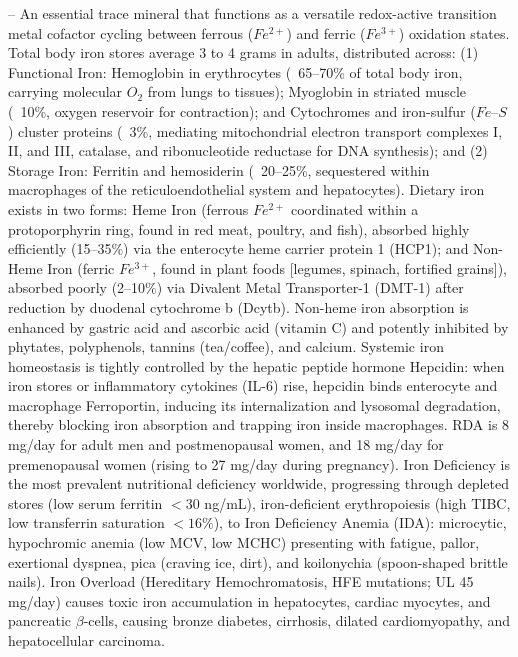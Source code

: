 -- An essential trace mineral that functions as a versatile redox-active transition metal cofactor cycling between ferrous ($Fe^{2+}$) and ferric ($Fe^{3+}$) oxidation states. Total body iron stores average 3 to 4 grams in adults, distributed across: (1) Functional Iron: Hemoglobin in erythrocytes (~65--70\% of total body iron, carrying molecular $O_2$ from lungs to tissues); Myoglobin in striated muscle (~10\%, oxygen reservoir for contraction); and Cytochromes and iron-sulfur ($Fe\text{--}S$) cluster proteins (~3\%, mediating mitochondrial electron transport complexes I, II, and III, catalase, and ribonucleotide reductase for DNA synthesis); and (2) Storage Iron: Ferritin and hemosiderin (~20--25\%, sequestered within macrophages of the reticuloendothelial system and hepatocytes). Dietary iron exists in two forms: Heme Iron (ferrous $Fe^{2+}$ coordinated within a protoporphyrin ring, found in red meat, poultry, and fish), absorbed highly efficiently (15--35\%) via the enterocyte heme carrier protein 1 (HCP1); and Non-Heme Iron (ferric $Fe^{3+}$, found in plant foods [legumes, spinach, fortified grains]), absorbed poorly (2--10\%) via Divalent Metal Transporter-1 (DMT-1) after reduction by duodenal cytochrome b (Dcytb). Non-heme iron absorption is enhanced by gastric acid and ascorbic acid (vitamin C) and potently inhibited by phytates, polyphenols, tannins (tea/coffee), and calcium. Systemic iron homeostasis is tightly controlled by the hepatic peptide hormone Hepcidin: when iron stores or inflammatory cytokines (IL-6) rise, hepcidin binds enterocyte and macrophage Ferroportin, inducing its internalization and lysosomal degradation, thereby blocking iron absorption and trapping iron inside macrophages. RDA is 8 mg/day for adult men and postmenopausal women, and 18 mg/day for premenopausal women (rising to 27 mg/day during pregnancy). Iron Deficiency is the most prevalent nutritional deficiency worldwide, progressing through depleted stores (low serum ferritin $<30$ ng/mL), iron-deficient erythropoiesis (high TIBC, low transferrin saturation $<16\%$), to Iron Deficiency Anemia (IDA): microcytic, hypochromic anemia (low MCV, low MCHC) presenting with fatigue, pallor, exertional dyspnea, pica (craving ice, dirt), and koilonychia (spoon-shaped brittle nails). Iron Overload (Hereditary Hemochromatosis, HFE mutations; UL 45 mg/day) causes toxic iron accumulation in hepatocytes, cardiac myocytes, and pancreatic $\beta$-cells, causing bronze diabetes, cirrhosis, dilated cardiomyopathy, and hepatocellular carcinoma.

